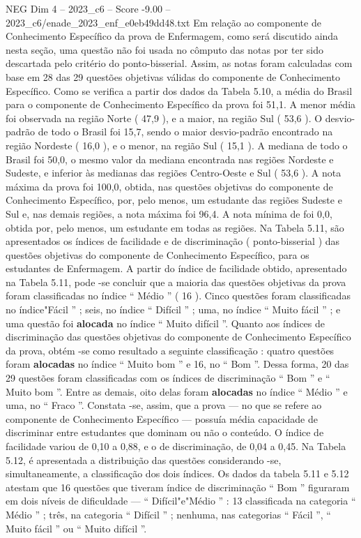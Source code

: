 \begin{textsample}{NEG Dim 4 – 2023\_c6 – Score -9.00 – 2023\_c6/enade\_2023\_enf\_e0eb49dd48.txt}
Em relação ao componente de Conhecimento Específico da prova de Enfermagem, como será discutido ainda nesta seção, uma questão não foi usada no cômputo das notas por ter sido descartada pelo critério do ponto-bisserial.
Assim, as notas foram calculadas com base em 28 das 29 questões objetivas válidas do componente de Conhecimento Específico.
Como se verifica a partir dos dados da Tabela 5.10, a média do Brasil para o componente de Conhecimento Específico da prova foi 51,1.
A menor média foi observada na região Norte ( 47,9 ), e a maior, na região Sul ( 53,6 ).
O desvio-padrão de todo o Brasil foi 15,7, sendo o maior desvio-padrão encontrado na região Nordeste ( 16,0 ), e o menor, na região Sul ( 15,1 ).
A mediana de todo o Brasil foi 50,0, o mesmo valor da mediana encontrada nas regiões Nordeste e Sudeste, e inferior às medianas das regiões Centro-Oeste e Sul ( 53,6 ).
A nota máxima da prova foi 100,0, obtida, nas questões objetivas do componente de Conhecimento Específico, por, pelo menos, um estudante das regiões Sudeste e Sul e, nas demais regiões, a nota máxima foi 96,4.
A nota mínima de foi 0,0, obtida por, pelo menos, um estudante em todas as regiões.
Na Tabela 5.11, são apresentados os índices de facilidade e de discriminação ( ponto-bisserial ) das questões objetivas do componente de Conhecimento Específico, para os estudantes de Enfermagem.
A partir do índice de facilidade obtido, apresentado na Tabela 5.11, pode -se concluir que a maioria das questões objetivas da prova foram classificadas no índice “ Médio ” ( 16 ).
Cinco questões foram classificadas no índice"Fácil ” ; seis, no índice “ Difícil ” ; uma, no índice “ Muito fácil ” ; e uma questão foi \textbf{alocada} no índice “ Muito difícil ”.
Quanto aos índices de discriminação das questões objetivas do componente de Conhecimento Específico da prova, obtém -se como resultado a seguinte classificação : quatro questões foram \textbf{alocadas} no índice “ Muito bom ” e 16, no “ Bom ”.
Dessa forma, 20 das 29 questões foram classificadas com os índices de discriminação “ Bom ” e “ Muito bom ”.
Entre as demais, oito delas foram \textbf{alocadas} no índice “ Médio ” e uma, no “ Fraco ”.
Constata -se, assim, que a prova — no que se refere ao componente de Conhecimento Específico — possuía média capacidade de discriminar entre estudantes que dominam ou não o conteúdo.
O índice de facilidade variou de 0,10 a 0,88, e o de discriminação, de 0,04 a 0,45.
Na Tabela 5.12, é apresentada a distribuição das questões considerando -se, simultaneamente, a classificação dos dois índices.
Os dados da tabela 5.11 e 5.12 atestam que 16 questões que tiveram índice de discriminação “ Bom ” figuraram em dois níveis de dificuldade — “ Difícil"e"Médio ” : 13 classificada na categoria “ Médio ” ; três, na categoria “ Difícil ” ; nenhuma, nas categorias “ Fácil ”, “ Muito fácil ” ou “ Muito difícil ”.

\end{textsample}
